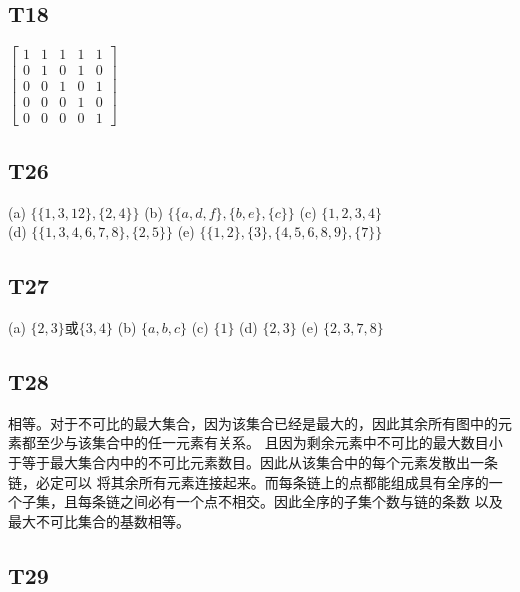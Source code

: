 \documentclass{article}
\begin{document}
\subsection{T18}
$
\begin{bmatrix}
    1 & 1 & 1 & 1 & 1\\
    0 & 1 & 0 & 1 & 0\\
    0 & 0 & 1 & 0 & 1\\
    0 & 0 & 0 & 1 & 0\\
    0 & 0 & 0 & 0 & 1
\end{bmatrix}
$
\subsection{T26}
(a) $\{\{1, 3, 12\}, \{2, 4\}\}$ \quad (b) $\{\{a, d, f\}, \{b, e\}, \{c\}\}$ \quad (c) $\{1, 2, 3, 4\}$\\
(d) $\{\{1, 3, 4, 6, 7, 8\}, \{2, 5\}\}$ \quad (e) $\{\{1, 2\}, \{3\}, \{4, 5, 6, 8, 9\}, \{7\}\}$
\subsection{T27}
(a) $\{2, 3\}$或$\{3, 4\}$ \quad (b) $\{a, b, c\}$ \quad (c) $\{1\}$
\quad (d) $\{2, 3\}$ \quad (e) $\{2, 3, 7, 8\}$
\subsection{T28}
相等。对于不可比的最大集合，因为该集合已经是最大的，因此其余所有图中的元素都至少与该集合中的任一元素有关系。
且因为剩余元素中不可比的最大数目小于等于最大集合内中的不可比元素数目。因此从该集合中的每个元素发散出一条链，必定可以
将其余所有元素连接起来。而每条链上的点都能组成具有全序的一个子集，且每条链之间必有一个点不相交。因此全序的子集个数与链的条数
以及最大不可比集合的基数相等。
\subsection{T29}
  
\end{document}
